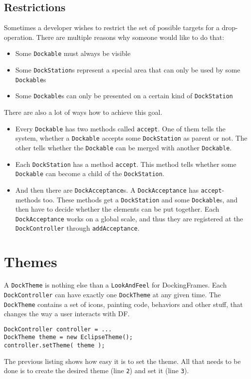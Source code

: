 \documentclass[a4paper,10pt]{article}
\newcommand{\src}[1]{\lstinline[basicstyle=\normalsize\ttfamily,keywordstyle=\normalsize\ttfamily,identifierstyle=\normalsize\ttfamily]|#1|}
\begin{document}
\subsection{Restrictions}
Sometimes a developer wishes to restrict the set of possible targets for a drop-operation. There are multiple reasons why someone would like to do that:
\begin{itemize}
 \item Some \src{Dockable} must always be visible
 \item Some \src{DockStation}s represent a special area that can only be used by some \src{Dockable}s
 \item Some \src{Dockable}s can only be presented on a certain kind of \src{DockStation}
\end{itemize}

There are also a lot of ways how to achieve this goal.
\begin{itemize}
 \item Every \src{Dockable} has two methods called \src{accept}. One of them tells the system, whether a \src{Dockable} accepts some \src{DockStation} as parent or not. The other tells whether the \src{Dockable} can be merged with another \src{Dockable}.
 \item Each \src{DockStation} has a method \src{accept}. This method tells whether some \src{Dockable} can become a child of the \src{DockStation}.
 \item And then there are \src{DockAcceptance}s. A \src{DockAcceptance} has \src{accept}-methods too. These methods get a \src{DockStation} and some \src{Dockable}s, and then have to decide whether the elements can be put together. Each \src{DockAcceptance} works on a global scale, and thus they are registered at the \src{DockController} through \src{addAcceptance}.
\end{itemize}

\section{Themes}
A \src{DockTheme} is nothing else than a \src{LookAndFeel} for DockingFrames. Each \src{DockController} can have exactly one \src{DockTheme} at any given time. The \src{DockTheme} contains a set of icons, painting code, behaviors and other stuff, that changes the way a user interacts with DF.

\begin{lstlisting}
DockController controller = ...
DockTheme theme = new EclipseTheme();
controller.setTheme( theme );
\end{lstlisting}
The previous listing shows how easy it is to set the theme. All that needs to be done is to create the desired theme (line \src{2}) and set it (line \src{3}).
\end{document}
